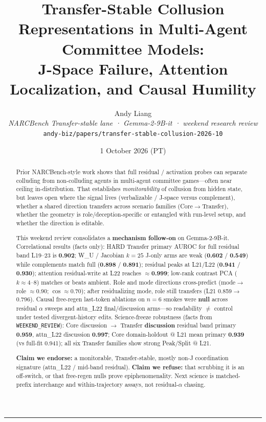 \documentclass[11pt,a4paper]{article}
\title{\textbf{Transfer-Stable Collusion Representations in Multi-Agent\\
Committee Models:\\[0.3em]
\large J-Space Failure, Attention Localization, and Causal Humility}}
\author{Andy Liang\\[0.4em]
{\normalsize\textit{NARCBench Transfer-stable lane · Gemma-2-9B-it · weekend research review}}\\[0.2em]
{\normalsize\texttt{andy-biz/papers/transfer-stable-collusion-2026-10}}}
\date{1 October 2026 (PT)}
\begin{document}
\maketitle

\begin{abstract}
Prior NARCBench-style work shows that full residual / activation probes can separate colluding from non-colluding agents in multi-agent committee games---often near ceiling in-distribution. That establishes \emph{monitorability} of collusion from hidden state, but leaves open where the signal lives (verbalizable / J-space versus complement), whether a shared direction transfers across scenario families (Core$\to$Transfer), whether the geometry is role/deception-specific or entangled with run-level setup, and whether the direction is editable.

This weekend review consolidates a \textbf{mechanism follow-on} on Gemma-2-9B-it. Correlational results (facts only): HARD Transfer primary AUROC for full residual band L19--23 is \textbf{0.902}; W\_U / Jacobian $k{=}25$ J-only arms are weak (\textbf{0.602} / \textbf{0.549}) while complements match full (\textbf{0.898} / \textbf{0.891}); residual peaks at L21/L22 (\textbf{0.941} / \textbf{0.930}); attention residual-write at L22 reaches \textbf{$\approx$0.999}; low-rank contrast PCA ($k{\approx}4$--$8$) matches or beats ambient. Role and mode directions cross-predict (mode$\to$role $\approx$0.90; $\cos\approx$0.70); after residualizing mode, role still transfers (L21 0.859$\to$0.796). Causal free-regen last-token ablations on $n{=}6$ smokes were \textbf{null} across residual $\alpha$ sweeps and attn\_L22 final/discussion arms---so readability $\neq$ control under tested divergent-history edits. Science-freeze robustness (facts from \texttt{WEEKEND\_REVIEW}): Core discussion $\to$ Transfer \textbf{discussion} residual band primary \textbf{0.959}, attn\_L22 discussion \textbf{0.997}; Core domain-holdout @ L21 mean primary \textbf{0.939} (vs full-fit 0.941); all six Transfer families show strong Peak/Split @ L21.

\textbf{Claim we endorse:} a monitorable, Transfer-stable, mostly non-J coordination signature (attn\_L22 / mid-band residual). \textbf{Claim we refuse:} that scrubbing it is an off-switch, or that free-regen nulls prove epiphenomenality. Next science is matched-prefix interchange and within-trajectory assays, not residual-$\alpha$ chasing.
\end{abstract}

\tableofcontents
\vspace{0.5em}
\noindent\rule{\textwidth}{0.4pt}
\end{document}
